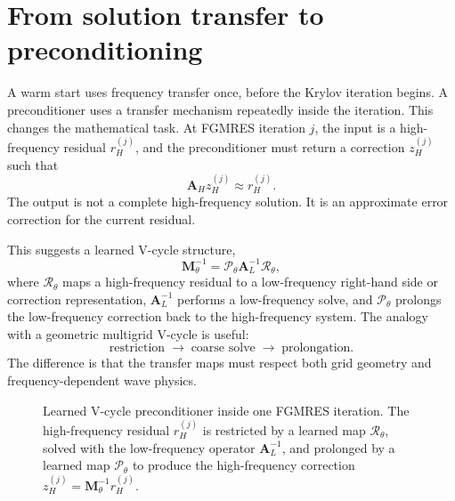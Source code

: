 \section{From solution transfer to preconditioning}
\label{sec:ch5-transfer-precond}

A warm start uses frequency transfer once, before the Krylov iteration begins.
A preconditioner uses a transfer mechanism repeatedly inside the iteration.
This changes the mathematical task. At FGMRES iteration $j$, the input is a
high-frequency residual $r_H^{(j)}$, and the preconditioner must return a
correction $z_H^{(j)}$ such that
\begin{equation}
    \mathbf{A}_H z_H^{(j)}
    \approx
    r_H^{(j)}.
    \label{eq:ch5-preconditioner-task}
\end{equation}
The output is not a complete high-frequency solution. It is an approximate
error correction for the current residual.

This suggests a learned V-cycle structure,
\begin{equation}
    \mathbf{M}_{\theta}^{-1}
    =
    \mathcal{P}_{\theta}
    \mathbf{A}_L^{-1}
    \mathcal{R}_{\theta},
    \label{eq:ch5-learned-vcycle}
\end{equation}
where $\mathcal{R}_{\theta}$ maps a high-frequency residual to a
low-frequency right-hand side or correction representation, $\mathbf{A}_L^{-1}$
performs a low-frequency solve, and $\mathcal{P}_{\theta}$ prolongs the
low-frequency correction back to the high-frequency system. The analogy with a
geometric multigrid V-cycle is useful:
\begin{equation}
    \text{restriction}
    \;\longrightarrow\;
    \text{coarse solve}
    \;\longrightarrow\;
    \text{prolongation}.
    \label{eq:ch5-vcycle-words}
\end{equation}
The difference is that the transfer maps must respect both grid geometry and
frequency-dependent wave physics.

\begin{figure}[htbp]
    \centering
    \caption{Learned V-cycle preconditioner inside one FGMRES iteration. The
    high-frequency residual $r_H^{(j)}$ is restricted by a learned map
    $\mathcal{R}_{\theta}$, solved with the low-frequency operator
    $\mathbf{A}_L^{-1}$, and prolonged by a learned map
    $\mathcal{P}_{\theta}$ to produce the high-frequency correction
    $z_H^{(j)}=\mathbf{M}_{\theta}^{-1}r_H^{(j)}$.}
    \label{fig:ch5-learned-vcycle-schematic}
\end{figure}

